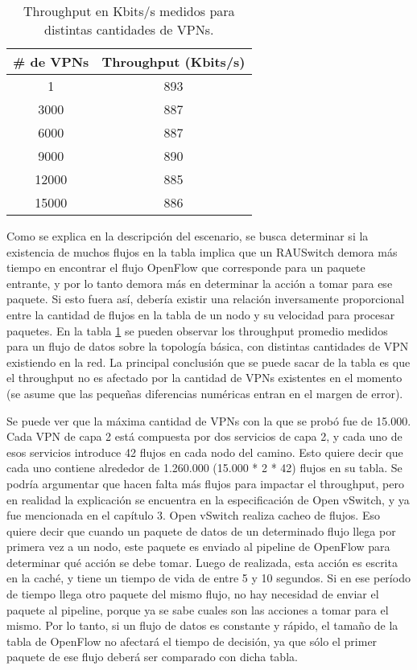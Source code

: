 \begin{table}[ht]
	\caption{Throughput en Kbits/s medidos para distintas cantidades de VPNs.}
	\centering 
	\begin{tabular}{c c}
		\hline\hline
		\# de VPNs & Throughput (Kbits/s) \\ [0.5ex]
		\hline
		1 & 893 \\
		3000 & 887 \\
		6000 & 887 \\
		9000 & 890 \\
		12000 & 885 \\
		15000 & 886 \\ [1ex]
		\hline
	\end{tabular}
	\label{table:escala_de_servicios}
\end{table}

Como se explica en la descripción del escenario, se busca determinar si la existencia de muchos flujos en la tabla implica que un RAUSwitch demora más tiempo en encontrar el flujo OpenFlow que corresponde para un paquete entrante, y por lo tanto demora más en determinar la acción a tomar para ese paquete. Si esto fuera así, debería existir una relación inversamente proporcional entre la cantidad de flujos en la tabla de un nodo y su velocidad para procesar paquetes. En la tabla \ref{table:escala_de_servicios} se pueden observar los throughput promedio medidos para un flujo de datos sobre la topología básica, con distintas cantidades de VPN existiendo en la red. La principal conclusión que se puede sacar de la tabla es que el throughput no es afectado por la cantidad de VPNs existentes en el momento (se asume que las pequeñas diferencias numéricas entran en el margen de error).

Se puede ver que la máxima cantidad de VPNs con la que se probó fue de 15.000. Cada VPN de capa 2 está compuesta por dos servicios de capa 2, y cada uno de esos servicios introduce 42 flujos en cada nodo del camino. Esto quiere decir que cada uno contiene alrededor de 1.260.000 (15.000 * 2 * 42) flujos en su tabla. Se podría argumentar que hacen falta más flujos para impactar el throughput, pero en realidad la explicación se encuentra en la especificación de Open vSwitch, y ya fue mencionada en el capítulo 3. Open vSwitch realiza cacheo de flujos. Eso quiere decir que cuando un paquete de datos de un determinado flujo llega por primera vez a un nodo, este paquete es enviado al pipeline de OpenFlow para determinar qué acción se debe tomar. Luego de realizada, esta acción es escrita en la caché, y tiene un tiempo de vida de entre 5 y 10 segundos. Si en ese período de tiempo llega otro paquete del mismo flujo, no hay necesidad de enviar el paquete al pipeline, porque ya se sabe cuales son las acciones a tomar para el mismo. Por lo tanto, si un flujo de datos es constante y rápido, el tamaño de la tabla de OpenFlow no afectará el tiempo de decisión, ya que sólo el primer paquete de ese flujo deberá ser comparado con dicha tabla.

